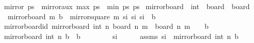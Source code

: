 \begin{isabellebody}
\isanewline
{}\isamarkupfalse%
\ {\isachardoublequoteopen}mirror{}\ ps\ {\isacharequal}{\kern0pt}\ mirror{}{\isacharunderscore}{\kern0pt}aux\ {\isacharparenleft}{\kern0pt}max{}\ ps\ {\isacharplus}{\kern0pt}\ min{}\ ps{\isacharparenright}{\kern0pt}\ ps{\isachardoublequoteclose}\isanewline
\isanewline
{}\isamarkupfalse%
\ mirror{}{\isacharunderscore}{\kern0pt}board\ {\isacharcolon}{\kern0pt}{\isacharcolon}{\kern0pt}\ {\isachardoublequoteopen}int\ {\isasymRightarrow}\ board\ {\isasymRightarrow}\ board{\isachardoublequoteclose}\ \isanewline
\ \ {\isachardoublequoteopen}mirror{}{\isacharunderscore}{\kern0pt}board\ m\ b\ {\isasymequiv}\ {\isacharbraceleft}{\kern0pt}mirror{}{\isacharunderscore}{\kern0pt}square\ m\ s\isactrlsub i\ {\isacharbar}{\kern0pt}s\isactrlsub i{\isachardot}{\kern0pt}\ s\isactrlsub i\ {\isasymin}\ b{\isacharbraceright}{\kern0pt}{\isachardoublequoteclose}%
\isadelimdocument
%
\endisadelimdocument
%
\isatagdocument
%
\isamarkuptrue%
%
\endisatagdocument
{\isafolddocument}%
%
\isadelimdocument
%
\endisadelimdocument
{}\isamarkupfalse%
\ mirror{}{\isacharunderscore}{\kern0pt}board{\isacharunderscore}{\kern0pt}id{\isacharcolon}{\kern0pt}\ {\isachardoublequoteopen}mirror{}{\isacharunderscore}{\kern0pt}board\ {\isacharparenleft}{\kern0pt}int\ n{\isacharplus}{\kern0pt}{}{\isacharparenright}{\kern0pt}\ {\isacharparenleft}{\kern0pt}board\ n\ m{\isacharparenright}{\kern0pt}\ {\isacharequal}{\kern0pt}\ board\ n\ m{\isachardoublequoteclose}\ {\isacharparenleft}{\kern0pt}\ {\isachardoublequoteopen}{\isacharunderscore}{\kern0pt}\ {\isacharequal}{\kern0pt}\ {\isacharquery}{\kern0pt}b{\isachardoublequoteclose}{\isacharparenright}{\kern0pt}\isanewline
%
\isadelimproof
%
\endisadelimproof
%
\isatagproof
{}\isamarkupfalse%
\isanewline
\ \ \isamarkupfalse%
\ {\isachardoublequoteopen}mirror{}{\isacharunderscore}{\kern0pt}board\ {\isacharparenleft}{\kern0pt}int\ n{\isacharplus}{\kern0pt}{}{\isacharparenright}{\kern0pt}\ {\isacharquery}{\kern0pt}b\ {\isasymsubseteq}\ {\isacharquery}{\kern0pt}b{\isachardoublequoteclose}\isanewline
\ \ \isamarkupfalse%
\isanewline
\ \ \ \ \isamarkupfalse%
\ s\isactrlsub i{\isacharprime}{\kern0pt}\isanewline
\ \ \ \ \isamarkupfalse%
\ assms{\isacharcolon}{\kern0pt}\ {\isachardoublequoteopen}s\isactrlsub i{\isacharprime}{\kern0pt}\ {\isasymin}\ mirror{}{\isacharunderscore}{\kern0pt}board\ {\isacharparenleft}{\kern0pt}int\ n{\isacharplus}{\kern0pt}{}{\isacharparenright}{\kern0pt}\ {\isacharquery}{\kern0pt}b{\isachardoublequoteclose}\isanewline

\end{isabellebody}
